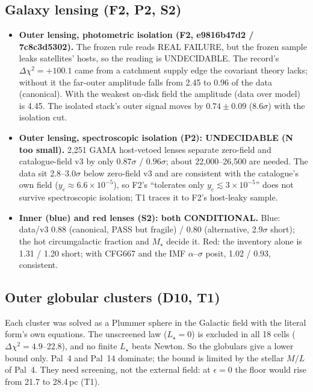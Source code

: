 \documentclass[10pt]{article}
\begin{document}
\subsection{Galaxy lensing (F2, P2, S2)}
\begin{itemize}
\item \textbf{Outer lensing, photometric isolation (F2, e9816b47d2 / 7c8c3d5302).} The frozen rule reads REAL FAILURE, but the frozen sample leaks satellites' hosts, so the reading is UNDECIDABLE. The record's $\Delta\chi^2=+100.1$ came from a catchment supply edge the covariant theory lacks; without it the far-outer amplitude falls from 2.45 to 0.96 of the data (canonical). With the weakest on-disk field the amplitude (data over model) is 4.45. The isolated stack's outer signal moves by $0.74\pm0.09$ (8.6$\sigma$) with the isolation cut.
\item \textbf{Outer lensing, spectroscopic isolation (P2): UNDECIDABLE (N too small).} 2,251 GAMA host-vetoed lenses separate zero-field and catalogue-field v3 by only $0.87\sigma$ / $0.96\sigma$; about 22,000--26,500 are needed. The data sit 2.8--3.0$\sigma$ below zero-field v3 and are consistent with the catalogue's own field ($y_e\approx6.6\times10^{-5}$), so F2's ``tolerates only $y_e\lesssim3\times10^{-5}$'' does not survive spectroscopic isolation; T1 traces it to F2's host-leaky sample.
\item \textbf{Inner (blue) and red lenses (S2): both CONDITIONAL.} Blue: data/v3 0.88 (canonical, PASS but fragile) / 0.80 (alternative, 2.9$\sigma$ short); the hot circumgalactic fraction and $M_\star$ decide it. Red: the inventory alone is 1.31 / 1.20 short; with CFG667 and the IMF $\alpha$--$\sigma$ posit, 1.02 / 0.93, consistent.
\end{itemize}

\subsection{Outer globular clusters (D10, T1)}
Each cluster was solved as a Plummer sphere in the Galactic field with the literal form's own equations. The unscreened law ($L_\star=0$) is excluded in all 18 cells ($\Delta\chi^2=4.9$--22.8), and no finite $L_\star$ beats Newton. So the globulars give a lower bound only. Pal~4 and Pal~14 dominate; the bound is limited by the stellar $M/L$ of Pal~4. They need screening, not the external field: at $\epsilon=0$ the floor would rise from 21.7 to 28.4\,pc (T1).
\end{document}
